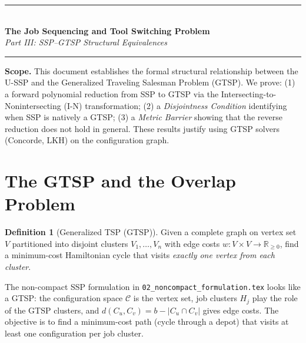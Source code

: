 \documentclass[11pt,a4paper]{article}
\theoremstyle{plain}
\theoremstyle{definition}
\newtheorem{definition}[theorem]{Definition}
\begin{document}

\begin{center}
  {\color{navyblue}\rule{\textwidth}{2pt}}\\[0.4cm]
  {\LARGE\bfseries\color{navyblue}The Job Sequencing and Tool Switching Problem}\\[0.3cm]
  {\large\itshape\color{midblue}Part III: SSP–GTSP Structural Equivalences}\\[0.2cm]
  {\color{navyblue}\rule{\textwidth}{2pt}}
\end{center}

\begin{mdframed}[backgroundcolor=lightblue,linecolor=navyblue,linewidth=1pt,
  innerleftmargin=14pt,innerrightmargin=14pt,innertopmargin=8pt,innerbottommargin=8pt]
\small\textbf{Scope.}
This document establishes the formal structural relationship between the U-SSP
and the Generalized Traveling Salesman Problem (GTSP).
We prove: (1) a forward polynomial reduction from SSP to GTSP via the
Intersecting-to-Nonintersecting (I-N) transformation;
(2) a \emph{Disjointness Condition} identifying when SSP is natively a GTSP;
(3) a \emph{Metric Barrier} showing that the reverse reduction does not hold
in general.
These results justify using GTSP solvers (Concorde, LKH) on the configuration graph.
\end{mdframed}

\vspace{0.5cm}
\tableofcontents
\newpage

\section{The GTSP and the Overlap Problem}
\label{sec:gtsp_overlap}

\begin{definition}[Generalized TSP (GTSP)]
Given a complete graph on vertex set $V$ partitioned into disjoint clusters
$V_1,\ldots,V_n$ with edge costs $w:V\times V\to\mathbb{R}_{\ge 0}$, find a
minimum-cost Hamiltonian cycle that visits \emph{exactly one vertex from each cluster}.
\end{definition}

The non-compact SSP formulation in \texttt{02\_noncompact\_formulation.tex} looks
like a GTSP: the configuration space $\mathcal{C}$ is the vertex set, job clusters
$H_j$ play the role of the GTSP clusters, and $d(C_u,C_v)=b-|C_u\cap C_v|$ gives
edge costs. The objective is to find a minimum-cost path (cycle through a depot)
that visits at least one configuration per job cluster.
\end{document}
